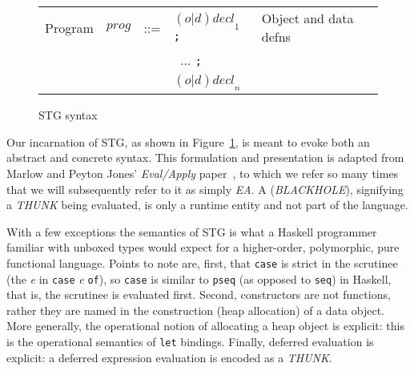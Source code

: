 \documentclass{llncs}
\begin{document}
\begin{figure}
\begin{tabular}{r r c l l}
\\
Program      & $\mathit{prog}$ & ::= & $\mathit{(o|d)decl}_1$ \texttt{;}            & Object and data defns \\
             &                 &     & \texttt{ } $\dots$ \texttt{;} \\
             &                 &     & $\mathit{(o|d)decl}_n$ & 

\end{tabular}
\caption{STG syntax}
\label{fig:STGsyntax}
\end{figure}

Our incarnation of STG, as shown in Figure~\ref{fig:STGsyntax}, is meant to
evoke both an abstract and concrete syntax.  This formulation and presentation
is adapted from Marlow and Peyton Jones' \emph{Eval/Apply}
paper~\cite{Marlow:2004}, to which we refer so many times that we will
subsequently refer to it as simply \emph{EA}.  A (\emph{BLACKHOLE}),
signifying a \emph{THUNK} being evaluated, is only a runtime entity and
not part of the language.

With a few exceptions the semantics of STG is what a Haskell programmer
familiar with unboxed types would expect for a higher-order, polymorphic, pure
functional language.  Points to note are, first, that \texttt{case} is strict
in the scrutinee (the \emph{e} in \texttt{case} \emph{e} \texttt{of}), so \texttt{case} is
similar to \texttt{pseq} (as opposed to \texttt{seq}) in Haskell, that is, the
scrutinee is evaluated first.  Second, constructors are not functions, rather
they are named in the construction (heap allocation) of a data object.  More
generally, the operational notion of allocating a heap object is explicit:
this is the operational semantics of \texttt{let} bindings.
Finally, deferred evaluation is explicit:
a deferred expression evaluation is encoded as a \emph{THUNK}.
\end{document}

